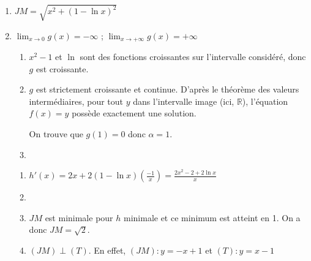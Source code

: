 \documentclass[12pt,a4paper,french]{article}
\newcommand{\R}{\mathbb{R}}
\begin{document}
\begin{solution}
  \begin{enumerate}
    \item $JM = \sqrt{x^2 + (1 - \ln x)^2}$
    \item $\lim_{x\to 0}g(x) = - \infty$ ; $\lim_{x\to +\infty}g(x) = + \infty$
      \begin{enumerate}
        \item $x^2 - 1$ et $\ln $ sont des fonctions croissantes sur
          l'intervalle considéré, donc $g$ est croissante.
        \item $g$ est strictement croissante et continue. D'après le
          théorème des valeurs intermédiaires, pour tout $y$ dans
          l'intervalle image (ici, $\R$), l'équation $f(x) = y$ possède
          exactement une solution.

          On trouve que $g(1) = 0$ donc $\alpha = 1$.
        \item ~\\
          \begin{center}
          \end{center}
      \end{enumerate}
      \begin{enumerate}
        \item $h'(x) = 2x + 2(1 - \ln x)\left(\frac{-1}x\right) =
          \frac{2x^2 - 2 + 2 \ln x}x$
        \item ~\\
          \begin{center}
          \end{center}
        \item $JM$ est minimale pour $h$ minimale et ce minimum est
          atteint en 1. On a donc $JM = \sqrt{2}$.
        \item $(JM) \perp (T)$. En effet, $(JM) : y = -x + 1$ et $(T) :
          y = x - 1$
      \end{enumerate}
  \end{enumerate}
\end{solution}
\end{document}
